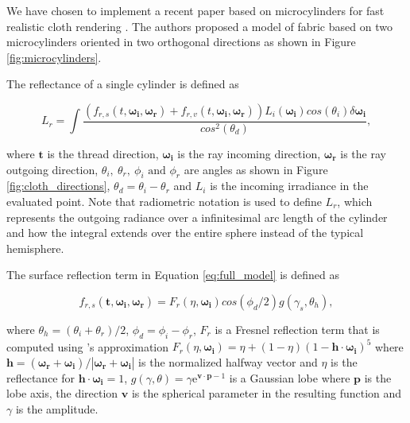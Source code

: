 \documentclass[12pt]{article}
\begin{document}
We have chosen to implement a recent paper based on microcylinders for fast realistic cloth rendering \cite{Sadeghi2013}.
The authors proposed a model of fabric based on two microcylinders oriented in two orthogonal directions as shown in Figure \ref{fig:microcylinders}.

The reflectance of a single cylinder is defined as

\begin{equation}
L_r = \int \frac{\left(f_{r,s}(t, \boldsymbol{\omega_i}, \boldsymbol{\omega_r}) + f_{r,v}(t,\boldsymbol{\omega_i},\boldsymbol{\omega_r})\right)L_i(\boldsymbol{\omega_i})cos(\theta_i)\delta \boldsymbol{\omega_i}}{cos^2(\theta_d)},
\label{eq:full_model}
\end{equation}

where $\mathbf{t}$ is the thread direction, $\boldsymbol{\omega_i}$ is the ray incoming direction, $\boldsymbol{\omega_r}$ is the ray outgoing direction, $\theta_i, ~\theta_r, ~ \phi_i \mbox{ and } \phi_r$ are angles as shown in Figure \ref{fig:cloth_directions},  $\theta_d = \theta_i-\theta_r$ and $L_i$ is the incoming irradiance in the evaluated point.
Note that radiometric notation \cite{Marschner2003} is used to define $L_r$, which represents the outgoing radiance over a infinitesimal arc length of the cylinder and how the integral extends over the entire sphere instead of the typical hemisphere.

The surface reflection term in Equation \ref{eq:full_model} is defined as

\begin{equation}
f_{r,s}(\mathbf{t}, \boldsymbol{\omega_i}, \boldsymbol{\omega_r}) = F_r(\eta, \boldsymbol{\omega_i}) cos(\phi_d/2)g(\gamma_s, \theta_h),
\end{equation}

where $\theta_h = (\theta_i+\theta_r)/2$, $\phi_d = \phi_i-\phi_r$, $F_r$ is a Fresnel reflection term that is computed using \citeauthor{Schlick1994}'s approximation \cite{Schlick1994} $F_r(\eta, \boldsymbol{\omega_i}) = \eta + (1 - \eta)(1 - \mathbf{h} \cdot \boldsymbol{\omega_i})^5$ where $\mathbf{h} = (\boldsymbol{\omega_r} + \boldsymbol{\omega_i})/ \left|\boldsymbol{\omega_r} + \boldsymbol{\omega_i} \right|$ is the normalized halfway vector and $\eta$ is the reflectance for $\mathbf{h} \cdot \boldsymbol{\omega_i} = 1$, $g(\gamma, \theta) = \gamma \mathrm{e} ^{\mathbf{v} \cdot \mathbf{p}-1}$ is a Gaussian lobe \cite{Wang2009} where $\mathbf{p}$ is the lobe axis, the direction $\mathbf{v}$ is the spherical parameter in the resulting function and $\gamma$ is the amplitude.
\end{document}
